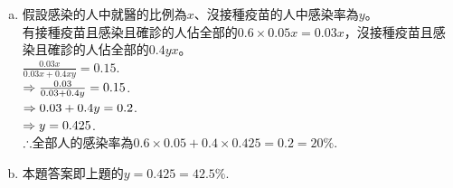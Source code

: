 \begin{pr}$ $
\begin{enumerate}[(a)]
\item 假設感染的人中就醫的比例為$x$、沒接種疫苗的人中感染率為$y$。\\
有接種疫苗且感染且確診的人佔全部的$0.6\times0.05x=0.03x$，沒接種疫苗且感染且確診的人佔全部的$0.4yx$。\\
$\frac{0.03x}{0.03x+0.4xy}=0.15$.\\
$\Rightarrow\frac{0.03}{0.03+0.4y}=0.15$.\\
$\Rightarrow0.03+0.4y=0.2$.\\
$\Rightarrow y=0.425$.\\
$\therefore$全部人的感染率為$0.6\times0.05+0.4\times0.425=0.2=20\%$.
\item 本題答案即上題的$y=0.425=42.5\%$.
\end{enumerate}
\end{pr}
